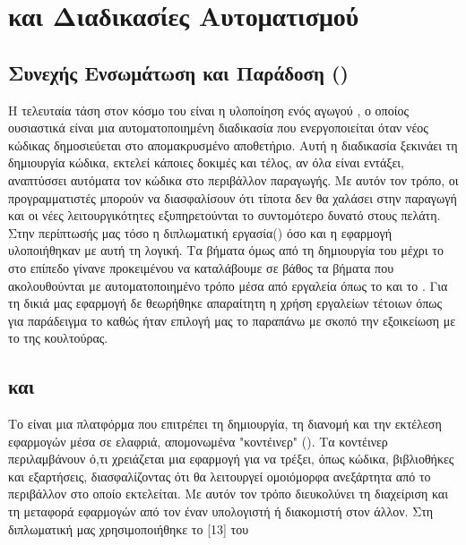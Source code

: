 \section{ και Διαδικασίες Αυτοματισμού}

\subsection{Συνεχής Ενσωμάτωση και Παράδοση () }

Η τελευταία τάση στον κόσμο του  είναι η υλοποίηση ενός αγωγού , ο οποίος ουσιαστικά
είναι μια αυτοματοποιημένη διαδικασία που ενεργοποιείται όταν νέος κώδικας δημοσιεύεται στο
απομακρυσμένο αποθετήριο. Αυτή η διαδικασία ξεκινάει τη δημιουργία κώδικα, εκτελεί κάποιες δοκιμές και
τέλος, αν όλα είναι εντάξει, αναπτύσσει αυτόματα τον κώδικα στο
περιβάλλον παραγωγής. Με αυτόν τον τρόπο, οι προγραμματιστές μπορούν να διασφαλίσουν ότι τίποτα δεν θα χαλάσει
στην παραγωγή και οι νέες λειτουργικότητες εξυπηρετούνται το συντομότερο δυνατό στους
πελάτη. Στην περίπτωσής μας τόσο η διπλωματική εργασία() όσο και η εφαρμογή υλοποιήθηκαν με αυτή τη λογική. Τα βήματα όμως
από τη δημιουργία του  μέχρι το  στο  επίπεδο γίνανε  προκειμένου να καταλάβουμε σε βάθος 
τα βήματα που ακολουθούνται με αυτοματοποιημένο τρόπο μέσα από εργαλεία όπως το  και το . Για τη δικιά μας εφαρμογή δε θεωρήθηκε απαραίτητη η χρήση εργαλείων  τέτοιων όπως για παράδειγμα το  καθώς ήταν επιλογή μας
το παραπάνω με σκοπό την εξοικείωση με το  της  κουλτούρας.



\subsection{ και }

Το  είναι μια πλατφόρμα που επιτρέπει τη δημιουργία, τη διανομή και την εκτέλεση εφαρμογών μέσα σε ελαφριά, απομονωμένα "κοντέινερ" (). 
Τα κοντέινερ περιλαμβάνουν ό,τι χρειάζεται μια εφαρμογή για να τρέξει, όπως κώδικα, βιβλιοθήκες και εξαρτήσεις, διασφαλίζοντας ότι θα λειτουργεί ομοιόμορφα 
ανεξάρτητα από το περιβάλλον στο οποίο εκτελείται. Με αυτόν τον τρόπο διευκολύνει τη διαχείριση και τη μεταφορά εφαρμογών από τον έναν υπολογιστή ή διακομιστή 
στον άλλον. Στη διπλωματική μας χρησιμοποιήθηκε το [13] του 

